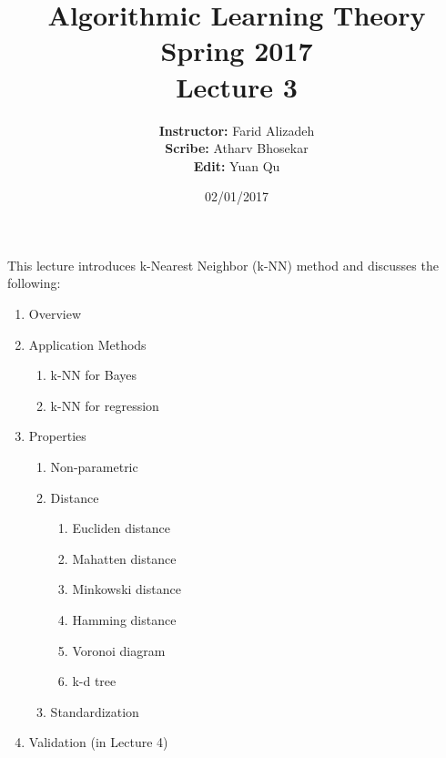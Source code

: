 \documentclass{article}
\title{ 
    Algorithmic Learning Theory\\
    Spring 2017\\
    Lecture 3
}
\author{
    {\bf Instructor:} Farid Alizadeh\\
    {\bf Scribe:} Atharv Bhosekar\\
    {\bf Edit:} Yuan Qu\\
}
\date{02/01/2017}
\begin{document}
\pagestyle{fancy}



\maketitle

\medskip

This lecture introduces k-Nearest Neighbor (k-NN) method and discusses the following:  


\begin{enumerate}
    \item Overview
    \item Application Methods
        \begin{enumerate}
            \item k-NN for Bayes
            \item k-NN for regression
        \end{enumerate}
    \item Properties
        \begin{enumerate}
            \item Non-parametric
            \item Distance
                \begin{enumerate}
                    \item Eucliden distance
                    \item Mahatten distance
                    \item Minkowski distance
                    \item Hamming distance
                    \item Voronoi diagram
                    \item k-d tree
                \end{enumerate}
            \item Standardization
        \end{enumerate}
    \item Validation (in Lecture 4)
\end{enumerate}     
\end{document}
